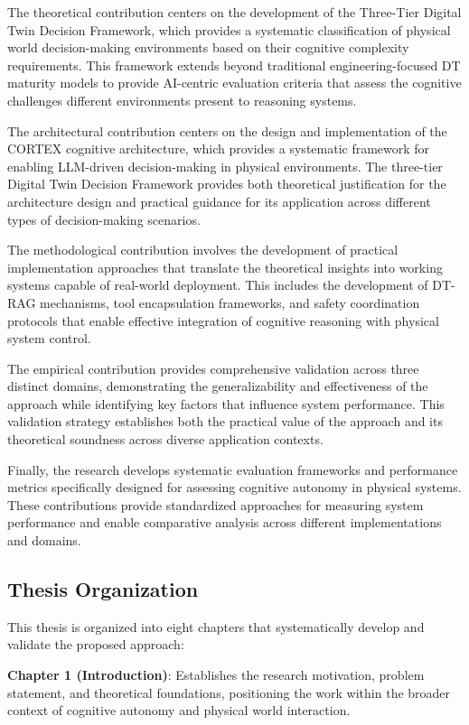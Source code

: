 The theoretical contribution centers on the development of the Three-Tier Digital Twin Decision Framework, which provides a systematic classification of physical world decision-making environments based on their cognitive complexity requirements. This framework extends beyond traditional engineering-focused DT maturity models to provide AI-centric evaluation criteria that assess the cognitive challenges different environments present to reasoning systems.

The architectural contribution centers on the design and implementation of the CORTEX cognitive architecture, which provides a systematic framework for enabling LLM-driven decision-making in physical environments. The three-tier Digital Twin Decision Framework provides both theoretical justification for the architecture design and practical guidance for its application across different types of decision-making scenarios.

The methodological contribution involves the development of practical implementation approaches that translate the theoretical insights into working systems capable of real-world deployment. This includes the development of DT-RAG mechanisms, tool encapsulation frameworks, and safety coordination protocols that enable effective integration of cognitive reasoning with physical system control.

The empirical contribution provides comprehensive validation across three distinct domains, demonstrating the generalizability and effectiveness of the approach while identifying key factors that influence system performance. This validation strategy establishes both the practical value of the approach and its theoretical soundness across diverse application contexts.

Finally, the research develops systematic evaluation frameworks and performance metrics specifically designed for assessing cognitive autonomy in physical systems. These contributions provide standardized approaches for measuring system performance and enable comparative analysis across different implementations and domains.

\subsection{Thesis Organization}

This thesis is organized into eight chapters that systematically develop and validate the proposed approach:

\textbf{Chapter 1 (Introduction)}: Establishes the research motivation, problem statement, and theoretical foundations, positioning the work within the broader context of cognitive autonomy and physical world interaction.

